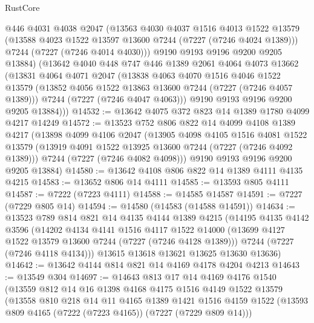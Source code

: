 \begin{lexlean}{RustCore}
\begin{coremodule}
        @446
        @4031
        @4038
        @2047
        (@13563
          @4030
          @4037
          @1516
          @4013
          @1522
          @13579
          (@13588 @4023 @1522 @13597 @13600 @7244 (@7227 (@7246 @4024 @1389)))
          @7244
          (@7227 (@7246 @4014 @4030)))
        @9190
        @9193
        @9196
        @9200
        @9205
        @13884)
      (@13642
        @4040
        @448
        @747
        @446
        @1389
        @2061
        @4064
        @4073
        @13662
        (@13831
          @4064
          @4071
          @2047
          (@13838
            @4063
            @4070
            @1516
            @4046
            @1522
            @13579
            (@13852 @4056 @1522 @13863 @13600 @7244 (@7227 (@7246 @4057 @1389)))
            @7244
            (@7227 (@7246 @4047 @4063)))
          @9190
          @9193
          @9196
          @9200
          @9205
          @13884)))
@14532 := @13642 @4075 @372 @823 @14 @1389 @1780 @4099 @4217 @14249
@14572 := @13523
    @752
    @806
    @822
    @14
    @4099
    @4108
    @1389
    @4217
    (@13898
      @4099
      @4106
      @2047
      (@13905
        @4098
        @4105
        @1516
        @4081
        @1522
        @13579
        (@13919 @4091 @1522 @13925 @13600 @7244 (@7227 (@7246 @4092 @1389)))
        @7244
        (@7227 (@7246 @4082 @4098)))
      @9190
      @9193
      @9196
      @9200
      @9205
      @13884)
@14580 := @13642 @4108 @806 @822 @14 @1389 @4111 @4135 @4215
@14583 := @13652 @806 @14 @4111
@14585 := @13593 @805 @4111
@14587 := @7222 (@7223 @4111)
@14588 := @14585 @14587
@14591 := @7227 (@7229 @805 @14)
@14594 := @14580 (@14583 (@14588 @14591))
@14634 := @13523
    @789
    @814
    @821
    @14
    @4135
    @4144
    @1389
    @4215
    (@14195
      @4135
      @4142
      @3596
      (@14202
        @4134
        @4141
        @1516
        @4117
        @1522
        @14000
        (@13699 @4127 @1522 @13579 @13600 @7244 (@7227 (@7246 @4128 @1389)))
        @7244
        (@7227 (@7246 @4118 @4134)))
      @13615
      @13618
      @13621
      @13625
      @13630
      @13636)
@14642 := @13642 @4144 @814 @821 @14 @4169 @4178 @4204 @4213
@14643 := @13549 @304
@14697 := @14643
    @813
    @17
    @14
    @4169
    @4176
    @1540
    (@13559
      @812
      @14
      @16
      @1398
      @4168
      @4175
      @1516
      @4149
      @1522
      @13579
      (@13558
        @810
        @218
        @14
        @11
        @4165
        @1389
        @1421
        @1516
        @4159
        @1522
        (@13593 @809 @4165 (@7222 (@7223 @4165)) (@7227 (@7229 @809 @14)))

\end{coremodule}
\end{lexlean}
